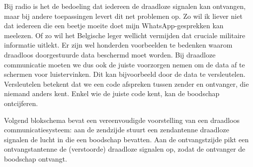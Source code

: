 \begin{enumerate}
     Bij radio is het de bedoeling dat iedereen de draadloze signalen kan ontvangen, maar bij andere toepassingen levert dit net problemen op. Zo wil ik liever niet dat iedereen die een beetje moeite doet mijn WhatsApp-gesprekken kan meelezen. Of zo wil het Belgische leger wellicht vermijden dat cruciale militaire informatie uitlekt. Er zijn wel honderden voorbeelden te bedenken waarom draadloos doorgestuurde data beschermd moet worden. Bij draadloze communicatie moeten we dus ook de juiste voorzorgen nemen om de data af te schermen voor luistervinken. Dit kan bijvoorbeeld door de data te versleutelen. Versleutelen betekent dat we een code afspreken tussen zender en ontvanger, die niemand anders kent. Enkel wie de juiste code kent, kan de boodschap ontcijferen.
 \end{enumerate}

 Volgend blokschema bevat een vereenvoudigde voorstelling van een draadloos communicatiesysteem: aan de zendzijde stuurt een zendantenne draadloze signalen de lucht in die een boodschap bevatten. Aan de ontvangstzijde pikt een ontvangstantenne de (verstoorde) draadloze signalen op, zodat de ontvanger de boodschap ontvangt.



 \makeatletter %
 \makeatother
 \begin{center}
 \end{center}




